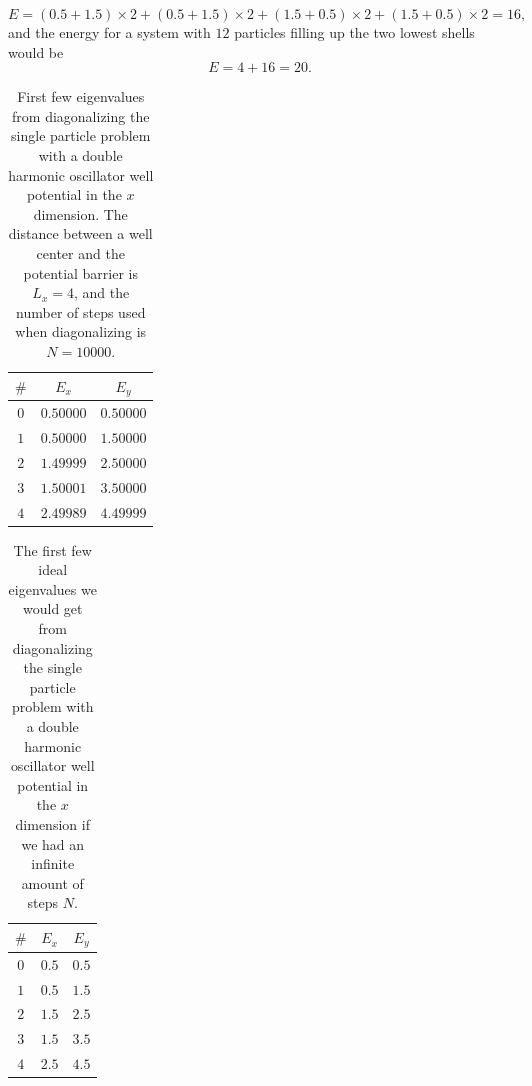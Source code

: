 \documentclass[../main.tex]{subfiles}
\begin{document}
\begin{equation}
    E = (0.5+1.5)\times 2 + (0.5+1.5)\times 2 + (1.5+0.5)\times 2 + (1.5+0.5)\times 2 = 16, 
\end{equation}
and the energy for a system with $12$ particles filling up the two lowest shells would be
\begin{equation}
    E = 4 + 16 = 20.
\end{equation}

\begin{table}[!ht]
  \centering
  \begin{tabular}{ | c | c | c | }
    \hline
    $\#$ & $E_x$ & $E_y$\\*
    \hline
    $0$ & $0.50000$ & $0.50000$\\*
    \hline
    $1$ & $0.50000$ & $1.50000$\\*
    \hline
    $2$ & $1.49999$ & $2.50000$\\*
    \hline
    $3$ & $1.50001$ & $3.50000$\\*
    \hline
    $4$ & $2.49989$ & $4.49999$\\*
    \hline
  \end{tabular}
  \caption{First few eigenvalues from diagonalizing the single particle problem with a double harmonic oscillator well potential in the $x$ dimension. The distance between a well center and the potential barrier is $L_x = 4$, and the number of steps used when diagonalizing is $N=10000$.}
  \label{tab:DoubleWellEigenvalues}
\end{table}

\begin{table}[!ht]
  \centering
  \begin{tabular}{ | c | c | c | }
    \hline
    $\#$ & $E_x$ & $E_y$\\*
    \hline
    $0$ & $0.5$ & $0.5$\\*
    \hline
    $1$ & $0.5$ & $1.5$\\*
    \hline
    $2$ & $1.5$ & $2.5$\\*
    \hline
    $3$ & $1.5$ & $3.5$\\*
    \hline
    $4$ & $2.5$ & $4.5$\\*
    \hline
  \end{tabular}
  \caption{The first few ideal eigenvalues we would get from diagonalizing the single particle problem with a double harmonic oscillator well potential in the $x$ dimension if we had an infinite amount of steps $N$.}
  \label{tab:DoubleWellEigenvaluesIdeal}
\end{table}
\end{document}
